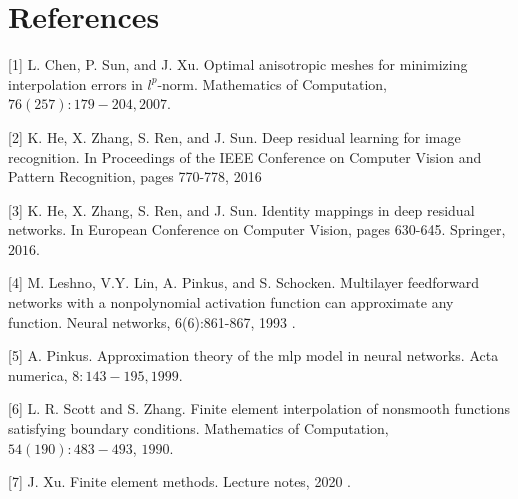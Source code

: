 \documentclass[10pt]{article}
\begin{document}
\section{References}
[1] L. Chen, P. Sun, and J. Xu. Optimal anisotropic meshes for minimizing interpolation errors in $l^{p}$-norm. Mathematics of Computation, $76(257): 179-204,2007 .$

[2] K. He, X. Zhang, S. Ren, and J. Sun. Deep residual learning for image recognition. In Proceedings of the IEEE Conference on Computer Vision and Pattern Recognition, pages 770-778, 2016

[3] K. He, X. Zhang, S. Ren, and J. Sun. Identity mappings in deep residual networks. In European Conference on Computer Vision, pages 630-645. Springer, $2016 .$

[4] M. Leshno, V.Y. Lin, A. Pinkus, and S. Schocken. Multilayer feedforward networks with a nonpolynomial activation function can approximate any function. Neural networks, 6(6):861-867, 1993 .

[5] A. Pinkus. Approximation theory of the mlp model in neural networks. Acta numerica, $8: 143-195,1999 .$

[6] L. R. Scott and S. Zhang. Finite element interpolation of nonsmooth functions satisfying boundary conditions. Mathematics of Computation, $54(190): 483-493$, $1990 .$

[7] J. Xu. Finite element methods. Lecture notes, 2020 .
\end{document}
